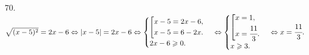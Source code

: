 70. $\sqrt{(x-5)^2}=2x-6\Leftrightarrow|x-5|=2x-6\Leftrightarrow\begin{cases}\left[
      \begin{gathered} x-5=2x-6,\hfill\\
      x-5=6-2x.\hfill \end{gathered}\right.\\
2x-6\geqslant0.\end{cases}\Leftrightarrow\begin{cases}\left[
      \begin{gathered} x=1,\hfill\\
      x=\cfrac{11}{3}.\hfill \end{gathered}\right.\\
x\geqslant3.\end{cases}\Leftrightarrow x=\cfrac{11}{3}.$\\
